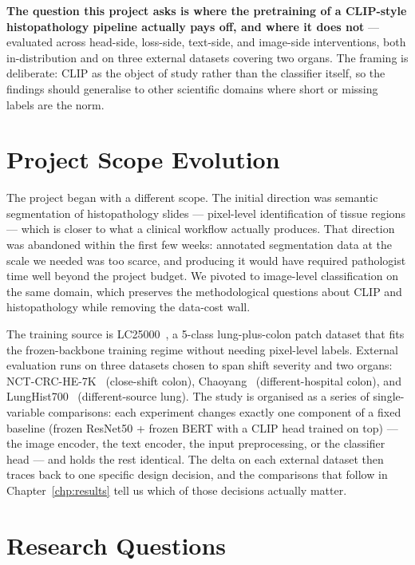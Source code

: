 \textbf{The question this project asks is where the pretraining of a CLIP-style histopathology pipeline actually pays off, and where it does not} --- evaluated across head-side, loss-side, text-side, and image-side interventions, both in-distribution and on three external datasets covering two organs. The framing is deliberate: CLIP as the object of study rather than the classifier itself, so the findings should generalise to other scientific domains where short or missing labels are the norm.


\section{Project Scope Evolution}
\label{sec:intro-scope}

The project began with a different scope. The initial direction was semantic segmentation of histopathology slides --- pixel-level identification of tissue regions --- which is closer to what a clinical workflow actually produces. That direction was abandoned within the first few weeks: annotated segmentation data at the scale we needed was too scarce, and producing it would have required pathologist time well beyond the project budget. We pivoted to image-level classification on the same domain, which preserves the methodological questions about CLIP and histopathology while removing the data-cost wall.

The training source is LC25000~\cite{borkowski2019lc25000}, a 5-class lung-plus-colon patch dataset that fits the frozen-backbone training regime without needing pixel-level labels. External evaluation runs on three datasets chosen to span shift severity and two organs: NCT-CRC-HE-7K~\cite{kather2019nct} (close-shift colon), Chaoyang~\cite{zhu2021chaoyang} (different-hospital colon), and LungHist700~\cite{tabatabaei2024lunghist} (different-source lung). The study is organised as a series of single-variable comparisons: each experiment changes exactly one component of a fixed baseline (frozen ResNet50 + frozen BERT with a CLIP head trained on top) --- the image encoder, the text encoder, the input preprocessing, or the classifier head --- and holds the rest identical. The delta on each external dataset then traces back to one specific design decision, and the comparisons that follow in Chapter~\ref{chp:results} tell us which of those decisions actually matter.


\section{Research Questions}
\label{sec:intro-rq}

